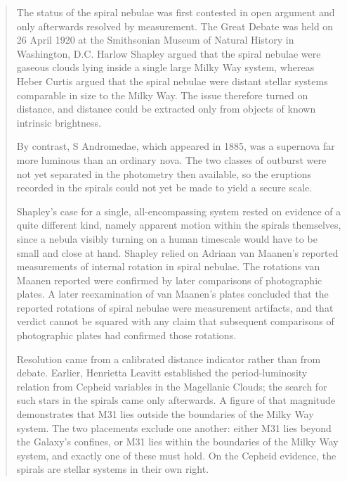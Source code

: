 \begin{quote}\small
The status of the spiral nebulae was first contested in open argument and only afterwards resolved by measurement. The Great Debate was held on 26 April 1920 at the Smithsonian Museum of Natural History in Washington, D.C. Harlow Shapley argued that the spiral nebulae were gaseous clouds lying inside a single large Milky Way system, whereas Heber Curtis argued that the spiral nebulae were distant stellar systems comparable in size to the Milky Way. The issue therefore turned on distance, and distance could be extracted only from objects of known intrinsic brightness.

 By contrast, S Andromedae, which appeared in 1885, was a supernova far more luminous than an ordinary nova. The two classes of outburst were not yet separated in the photometry then available, so the eruptions recorded in the spirals could not yet be made to yield a secure scale.

Shapley's case for a single, all-encompassing system rested on evidence of a quite different kind, namely apparent motion within the spirals themselves, since a nebula visibly turning on a human timescale would have to be small and close at hand. Shapley relied on Adriaan van Maanen's reported measurements of internal rotation in spiral nebulae. The rotations van Maanen reported were confirmed by later comparisons of photographic plates. A later reexamination of van Maanen's plates concluded that the reported rotations of spiral nebulae were measurement artifacts, and that verdict cannot be squared with any claim that subsequent comparisons of photographic plates had confirmed those rotations.

Resolution came from a calibrated distance indicator rather than from debate. Earlier, Henrietta Leavitt established the period-luminosity relation from Cepheid variables in the Magellanic Clouds; the search for such stars in the spirals came only afterwards.  A figure of that magnitude demonstrates that M31 lies outside the boundaries of the Milky Way system. The two placements exclude one another: either M31 lies beyond the Galaxy's confines, or M31 lies within the boundaries of the Milky Way system, and exactly one of these must hold. On the Cepheid evidence, the spirals are stellar systems in their own right.
\end{quote}

